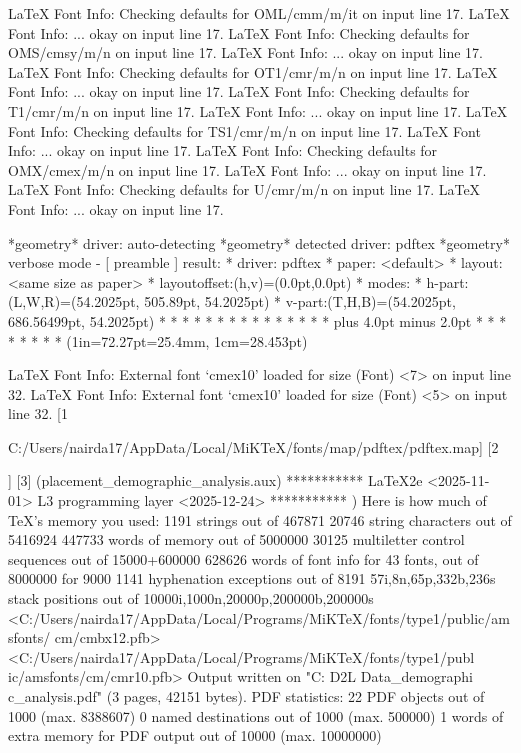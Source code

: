LaTeX Font Info:    Checking defaults for OML/cmm/m/it on input line 17.
LaTeX Font Info:    ... okay on input line 17.
LaTeX Font Info:    Checking defaults for OMS/cmsy/m/n on input line 17.
LaTeX Font Info:    ... okay on input line 17.
LaTeX Font Info:    Checking defaults for OT1/cmr/m/n on input line 17.
LaTeX Font Info:    ... okay on input line 17.
LaTeX Font Info:    Checking defaults for T1/cmr/m/n on input line 17.
LaTeX Font Info:    ... okay on input line 17.
LaTeX Font Info:    Checking defaults for TS1/cmr/m/n on input line 17.
LaTeX Font Info:    ... okay on input line 17.
LaTeX Font Info:    Checking defaults for OMX/cmex/m/n on input line 17.
LaTeX Font Info:    ... okay on input line 17.
LaTeX Font Info:    Checking defaults for U/cmr/m/n on input line 17.
LaTeX Font Info:    ... okay on input line 17.

*geometry* driver: auto-detecting
*geometry* detected driver: pdftex
*geometry* verbose mode - [ preamble ] result:
* driver: pdftex
* paper: <default>
* layout: <same size as paper>
* layoutoffset:(h,v)=(0.0pt,0.0pt)
* modes: 
* h-part:(L,W,R)=(54.2025pt, 505.89pt, 54.2025pt)
* v-part:(T,H,B)=(54.2025pt, 686.56499pt, 54.2025pt)
* \paperwidth=614.295pt
* \paperheight=794.96999pt
* \textwidth=505.89pt
* \textheight=686.56499pt
* \oddsidemargin=-18.06749pt
* \evensidemargin=-18.06749pt
* \topmargin=-55.06749pt
* \headheight=12.0pt
* \headsep=25.0pt
* \topskip=11.0pt
* \footskip=30.0pt
* \marginparwidth=59.0pt
* \marginparsep=10.0pt
* \columnsep=10.0pt
* \skip\footins=10.0pt plus 4.0pt minus 2.0pt
* \hoffset=0.0pt
* \voffset=0.0pt
* 
* \@twocolumnfalse
* \@twosidefalse
* \@mparswitchfalse
* \@reversemarginfalse
* (1in=72.27pt=25.4mm, 1cm=28.453pt)

LaTeX Font Info:    External font `cmex10' loaded for size
(Font)              <7> on input line 32.
LaTeX Font Info:    External font `cmex10' loaded for size
(Font)              <5> on input line 32.
[1

{C:/Users/nairda17/AppData/Local/MiKTeX/fonts/map/pdftex/pdftex.map}]
[2

] [3] (placement_demographic_analysis.aux)
 ***********
LaTeX2e <2025-11-01>
L3 programming layer <2025-12-24>
 ***********
 ) 
Here is how much of TeX's memory you used:
 1191 strings out of 467871
 20746 string characters out of 5416924
 447733 words of memory out of 5000000
 30125 multiletter control sequences out of 15000+600000
 628626 words of font info for 43 fonts, out of 8000000 for 9000
 1141 hyphenation exceptions out of 8191
 57i,8n,65p,332b,236s stack positions out of 10000i,1000n,20000p,200000b,200000s
<C:/Users/nairda17/AppData/Local/Programs/MiKTeX/fonts/type1/public/amsfonts/
cm/cmbx12.pfb><C:/Users/nairda17/AppData/Local/Programs/MiKTeX/fonts/type1/publ
ic/amsfonts/cm/cmr10.pfb>
Output written on "C:\Users{}\Desktop{} D2L Data\placement_demographi
c_analysis.pdf" (3 pages, 42151 bytes).
PDF statistics:
 22 PDF objects out of 1000 (max. 8388607)
 0 named destinations out of 1000 (max. 500000)
 1 words of extra memory for PDF output out of 10000 (max. 10000000)

